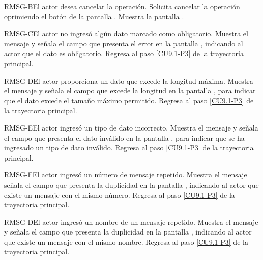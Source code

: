 	\begin{UCtrayectoriaA}{RMSG-B}{El actor desea cancelar la operación.}
		\UCpaso[\UCactor] Solicita cancelar la operación oprimiendo el botón  de la pantalla .
		\UCpaso[\UCsist] Muestra la pantalla .
	\end{UCtrayectoriaA}

	\begin{UCtrayectoriaA}{RMSG-C}{El actor no ingresó algún dato marcado como obligatorio.}
		\UCpaso[\UCsist] Muestra el mensaje  y señala el campo que presenta el error en la pantalla , indicando al actor que el dato es obligatorio.
		\UCpaso Regresa al paso \ref{CU9.1-P3} de la trayectoria principal.
	\end{UCtrayectoriaA}

	\begin{UCtrayectoriaA}{RMSG-D}{El actor proporciona un dato que excede la longitud máxima.}
		\UCpaso[\UCsist] Muestra el mensaje  y señala el campo que excede la longitud en la pantalla , para indicar que el dato excede el tamaño máximo permitido.
		\UCpaso Regresa al paso \ref{CU9.1-P3} de la trayectoria principal.
	\end{UCtrayectoriaA}

	\begin{UCtrayectoriaA}{RMSG-E}{El actor ingresó un tipo de dato incorrecto.}
		\UCpaso[\UCsist] Muestra el mensaje  y señala el campo que presenta el dato inválido en la pantalla , para indicar que se ha ingresado un tipo de dato inválido.
		\UCpaso Regresa al paso \ref{CU9.1-P3} de la trayectoria principal.
	\end{UCtrayectoriaA}

	\begin{UCtrayectoriaA}{RMSG-F}{El actor ingresó un número de mensaje repetido.}
		\UCpaso[\UCsist] Muestra el mensaje  señala el campo que presenta la duplicidad en la pantalla , indicando al actor que existe un mensaje con el mismo número.
		\UCpaso Regresa al paso \ref{CU9.1-P3} de la trayectoria principal.
	\end{UCtrayectoriaA}
	
	\begin{UCtrayectoriaA}{RMSG-D}{El actor ingresó un nombre de un mensaje repetido.}
		\UCpaso[\UCsist] Muestra el mensaje  y señala el campo que presenta la duplicidad en la pantalla , indicando al actor que existe un mensaje con el mismo nombre.
		\UCpaso Regresa al paso \ref{CU9.1-P3} de la trayectoria principal.
	\end{UCtrayectoriaA}
